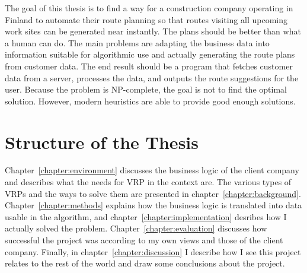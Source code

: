 The goal of this thesis is to find a way for a construction company operating in Finland to automate their route planning so that routes visiting all upcoming work sites can be generated near instantly. The plans should be better than what a human can do. The main problems are adapting the business data into information suitable for algorithmic use and actually generating the route plans from customer data. The end result should be a program that fetches customer data from a server, processes the data, and outputs the route suggestions for the user. Because the problem is NP-complete, the goal is not to find the optimal solution. However, modern heuristics are able to provide good enough solutions. 




\section{Structure of the Thesis}
Chapter~\ref{chapter:environment} discusses the business logic of the client company and describes what the needs for VRP in the context are. The various types of VRPs and the ways to solve them are presented in chapter~\ref{chapter:background}. Chapter~\ref{chapter:methods} explains how the business logic is translated into data usable in the algorithm, and chapter~\ref{chapter:implementation} desribes how I actually solved the problem. Chapter~\ref{chapter:evaluation} discusses how successful the project was according to my own views and those of the client company. Finally, in chapter~\ref{chapter:discussion} I describe how I see this project relates to the rest of the world and draw some conclusions about the project. 